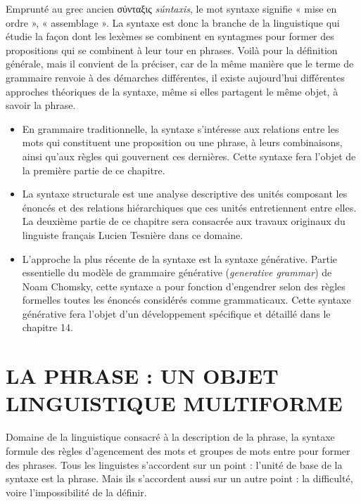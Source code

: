 \begin{keybox}[Introduction]
\renewcommand{\thempfootnote}{校\arabic{editorialnote}}
Emprunté au grec ancien {\BBSixGreek σύνταξις} \textit{súntaxis}, le mot syntaxe signifie « mise en ordre », « assemblage ». La syntaxe est donc la branche de la linguistique qui étudie la façon dont les lexèmes se combinent en syntagmes pour former des propositions qui se combinent à leur tour en phrases. Voilà pour la définition générale, mais il convient de la préciser, car de la même manière que le terme de grammaire renvoie à des démarches différentes, il existe aujourd’hui différentes approches théoriques de la syntaxe, même si elles partagent le même objet, à savoir la phrase.
\begin{itemize}
\item En grammaire traditionnelle, la syntaxe s’intéresse aux relations entre les mots qui constituent une proposition ou une phrase, à leurs combinaisons, ainsi qu’aux règles qui gouvernent ces dernières. Cette syntaxe fera l’objet de la première partie de ce chapitre.
\item La syntaxe structurale est une analyse descriptive des unités composant les énoncés et des relations hiérarchiques que ces unités entretiennent entre elles. La deuxième partie de ce chapitre sera consacrée aux travaux originaux du linguiste français Lucien Tesnière dans ce domaine.
\item L’approche la plus récente de la syntaxe est la syntaxe générative. Partie essentielle du modèle de grammaire générative (\textit{generative grammar}) de Noam Chomsky, cette syntaxe a pour fonction d’engendrer selon des règles formelles toutes les énoncés considérés comme grammaticaux. Cette syntaxe générative fera l’objet d’un développement spécifique et détaillé dans le chapitre 14.
\end{itemize}
\end{keybox}

\section{LA PHRASE : UN OBJET LINGUISTIQUE MULTIFORME}
Domaine de la linguistique consacré à la description de la phrase, la syntaxe formule des règles d’agencement des mots et groupes de mots entre pour former des phrases. Tous les linguistes s’accordent sur un point : l’unité de base de la syntaxe est la phrase. Mais ils s’accordent aussi sur un autre point : la difficulté, voire l’impossibilité de la définir.


